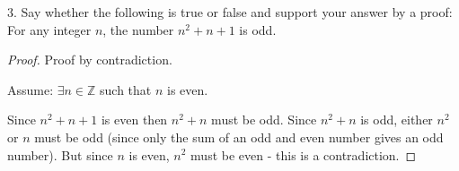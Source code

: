 \documentclass[a4paper,12pt]{article}
\begin{document}
3. Say whether the following is true or false and support your answer by a
proof: For any integer $n$, the number $n^2 + n + 1$ is odd.

\begin{proof}

  Proof by contradiction.

  Assume: $\exists n \in \mathbb{Z}$ such that $n$ is even.

  Since $n^2 + n + 1$ is even then $n^2 + n$ must be odd.
  Since $n^2 + n$ is odd, either $n^2$ or $n$ must be odd (since only the sum of
  an odd and even number gives an odd number). But since $n$ is even, $n^2$ must
  be even - this is a contradiction.
  
\end{proof}
\end{document}
